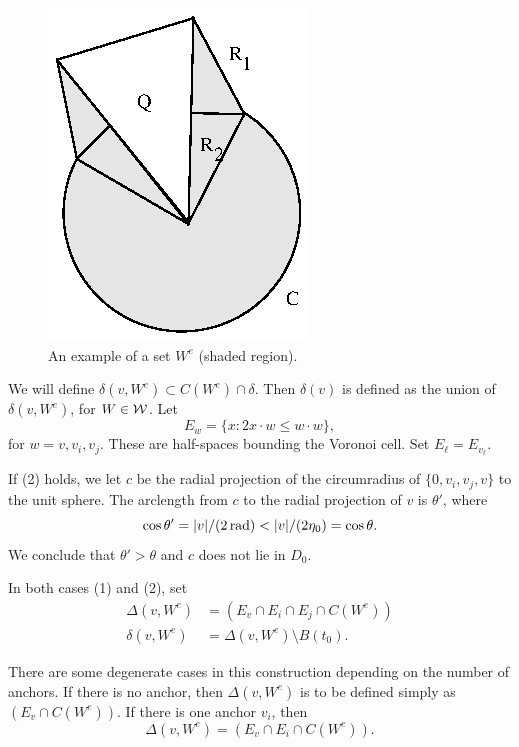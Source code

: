 \begin{figure}[htb]
  \centering
  \includegraphics{PS/diag46.ps}
  \caption{An example of a set $W^e$ (shaded region).}
  \label{fig:anchor-quarter}
\end{figure}

We will define
    $\delta(v,W^e)\subset C(W^e)\cap \delta$.
Then $\delta(v)$ is defined as the union of $\delta(v,W^e)$, for
$W\in{\mathcal W}$. Let
    $$E_w = \{x : 2 x\cdot w \le w\cdot w\},$$
for $w = v,v_i,v_j$. These are half-spaces bounding the Voronoi
cell. Set $E_\ell = E_{v_\ell}$.

If (2) holds, we let $c$ be the radial projection of the
circumradius of $\{0,v_i,v_j,v\}$ to the unit sphere.  The arclength
from $c$ to the radial projection of $v$ is $\theta'$, where
$$\cos\theta' = |v|/(2\rad)<|v|/(2\eta_0) = \cos\theta.$$
We conclude that $\theta'>\theta$ and $c$ does not lie in $D_0$.

\begin{definition} \label{def:delta-e}
In both cases (1) and (2), set
    $$
    \begin{array}{lll}
    \Delta(v,W^e) &= (E_v\cap E_i\cap E_j \cap C(W^e))\\
    \delta(v,W^e) &= \Delta(v,W^e)\setminus B(t_0).
    \end{array}
    $$
\end{definition}

\begin{remark}
There are some degenerate cases in this construction depending on
the number of anchors.  If there is no anchor, then
$\Delta(v,W^e)$ is to be defined simply as $(E_v \cap C(W^e))$.
If there is one anchor $v_i$, then
    $$
    \Delta(v,W^e) = (E_v\cap E_i\cap C(W^e)).
    $$
\end{remark}

